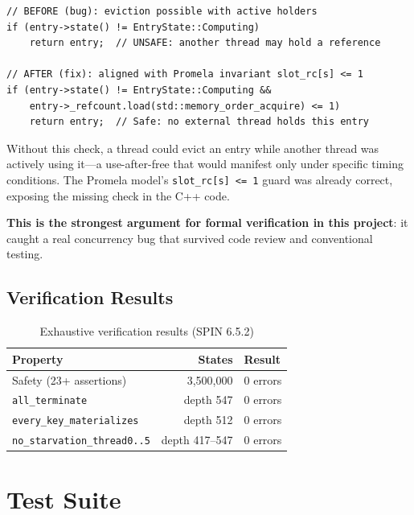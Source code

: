 \documentclass[11pt,a4paper]{article}
\begin{document}
\begin{lstlisting}[caption=Bug found by formal verification]
// BEFORE (bug): eviction possible with active holders
if (entry->state() != EntryState::Computing)
    return entry;  // UNSAFE: another thread may hold a reference

// AFTER (fix): aligned with Promela invariant slot_rc[s] <= 1
if (entry->state() != EntryState::Computing &&
    entry->_refcount.load(std::memory_order_acquire) <= 1)
    return entry;  // Safe: no external thread holds this entry
\end{lstlisting}

Without this check, a thread could evict an entry while another thread
was actively using it---a use-after-free that would manifest only under
specific timing conditions.  The Promela model's
\texttt{slot\_rc[s] <= 1} guard was already correct, exposing the
missing check in the C++ code.

\textbf{This is the strongest argument for formal verification in this
project}: it caught a real concurrency bug that survived code review and
conventional testing.

\subsection{Verification Results}

\begin{table}[htbp]
\centering
\begin{tabular}{@{}lrl@{}}
\toprule
Property & States & Result \\
\midrule
Safety (23+ assertions) & 3,500,000 & 0 errors \\
\texttt{all\_terminate} & depth 547 & 0 errors \\
\texttt{every\_key\_materializes} & depth 512 & 0 errors \\
\texttt{no\_starvation\_thread0..5} & depth 417--547 & 0 errors \\
\bottomrule
\end{tabular}
\caption{Exhaustive verification results (SPIN 6.5.2)}
\end{table}

\section{Test Suite}
\label{sec:tests}
\end{document}
